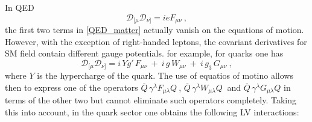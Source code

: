 \documentclass[12pt,preprintnumbers,nofootinbib]{revtex4}
\newcommand{\ov}{\overline}
\begin{document}
	In QED
\begin{equation}
\label{Fmn}
	\mathcal{D}_{[\mu}\mathcal{D}_{\nu]} = i e F_{\mu\nu}~, 
\end{equation} 
	the first two terms in \eqref{QED_matter} actually vanish on 
	the equations of motion.
	However, with the exception of right-handed leptons, 
	the covariant derivatives for SM field contain different gauge potentials. for example, for quarks one has
\begin{equation}
\label{FmnQCD}
	\mathcal{D}_{[\mu}\mathcal{D}_{\nu]} = 
	i\, Y g'\, F_{\mu\nu} ~+~ 
	i\, g\, W_{\mu\nu} ~+~
	i\, g_3\, G_{\mu\nu}~,
\end{equation}
	where $ Y $ is the hypercharge of the quark.
	The use of equatios of motino allows then to express one of the operators 
$ \ov{Q}\, \gamma^\lambda F_{\mu\lambda} Q~ $,
$ \ov{Q}\, \gamma^\lambda W_{\mu\lambda} Q~ $ and
$ \ov{Q}\, \gamma^\lambda G_{\mu\lambda} Q $
	in terms of the other two but cannot eliminate such operators completely.
	Taking this into account, 
	in the quark sector 
	one obtains the following LV interactions:
\end{document}
